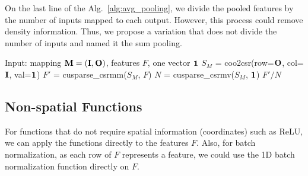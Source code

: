 On the last line of the Alg.~\ref{alg:avg_pooling}, we divide the pooled features by the number of inputs mapped to each output. However, this process could remove density information. Thus, we propose a variation that does not divide the number of inputs and named it the sum pooling.
\begin{algorithm}
  \caption{GPU Sparse Tensor AvgPooling}
  \label{alg:avg_pooling}
\begin{algorithmic}
  \State Input: mapping $\mathbf{M} = (\mathbf{I}, \mathbf{O})$, features $F$, one vector $\mathbf{1}$
  \State $S_M$ = coo2csr(row=$\mathbf{O}$, col=$\mathbf{I}$, val=$\mathbf{1}$)
  \State $F'$ = cusparse\_csrmm($S_M$, $F$)
  \State $N$ = cusparse\_csrmv($S_M$, $\mathbf{1}$)
  \State \Return $F' / N$
\end{algorithmic}
\end{algorithm}




\subsection{Non-spatial Functions}
For functions that do not require spatial information (coordinates) such as ReLU, we can apply the functions directly to the features $F$. Also, for batch normalization, as each row of $F$ represents a feature, we could use the 1D batch normalization function directly on $F$.
